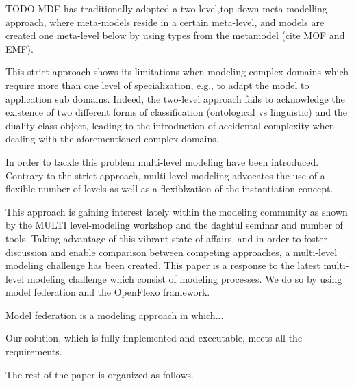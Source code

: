 TODO
MDE has traditionally adopted a two-level,top-down meta-modelling approach, where meta-models reside in a certain meta-level, and models are created one meta-level below by using types from the metamodel (cite MOF and EMF).

This strict approach shows its limitations when modeling complex domains which require more than one level of specialization, e.g., to adapt the model to application sub domains. Indeed, the two-level approach fails to acknowledge the existence of two different forms of classification (ontological vs linguistic) and the duality class-object, leading to the introduction of accidental complexity when dealing with the aforementioned complex domains.

In order to tackle this problem multi-level modeling have been introduced. Contrary to the strict approach, multi-level modeling advocates the use of a flexible number of levels as well as a flexiblzation of the instantiation concept.

This approach is gaining interest lately within the modeling community as shown by the MULTI level-modeling workshop and the daghtul seminar and number of tools. Taking advantage of this vibrant state of affairs, and in order to foster discussion and enable comparison between competing approaches, a multi-level modeling challenge has been created. This paper is a response to the latest multi-level modeling challenge which consist of modeling processes. We do so by using model federation and the OpenFlexo framework.

Model federation is a modeling approach in which...

Our solution, which is fully implemented and executable, meets all the requirements.

The rest of the paper is organized as follows.





